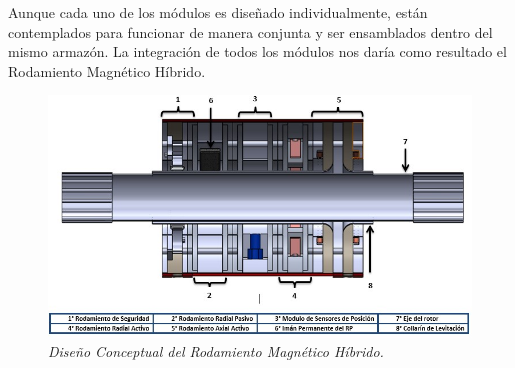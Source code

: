 Aunque cada uno de los módulos es diseñado individualmente, están contemplados para funcionar de manera conjunta y ser ensamblados dentro del mismo armazón. La integración de todos los módulos nos daría como resultado el Rodamiento Magnético Híbrido. 

\begin{figure}[htb]
\centering
	\includegraphics[width=\textwidth]{images/Capitulo_2/RMH}
	\caption{\textit{Diseño Conceptual del Rodamiento Magnético Híbrido.}}
	\label{fig:system:example1}
\end{figure}
